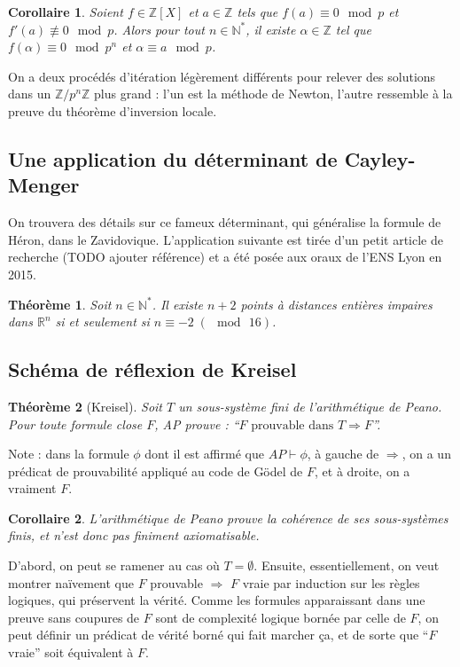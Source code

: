 \documentclass[a4paper, 11pt]{article}
\def\Z{\mathbb{Z}}
\def\N{\mathbb{N}}
\def\R{\mathbb{R}}
\newtheorem*{theorem}{Théorème}
\newtheorem*{corollary}{Corollaire}
\begin{document}
\begin{corollary}
  Soient $f \in \Z[X]$ et $a \in \Z$ tels que $f(a) \equiv 0 \mod p$
  et $f'(a) \not\equiv 0 \mod p$. Alors pour tout $n \in \N^*$, il
  existe $\alpha \in \Z$ tel que $f(\alpha) \equiv 0 \mod p^n$ et
  $\alpha \equiv a \mod p$.
\end{corollary}

On a deux procédés d'itération légèrement différents pour relever des solutions
dans un $\Z/p^n\Z$ plus grand : l'un est la méthode de Newton, l'autre ressemble
à la preuve du théorème d'inversion locale.

\subsection{Une application du déterminant de Cayley-Menger}

On trouvera des détails sur ce fameux déterminant, qui généralise la formule de
Héron, dans le Zavidovique. L'application suivante est tirée d'un petit article
de recherche (TODO ajouter référence) et a été posée aux oraux de l'ENS Lyon en
2015.

\begin{theorem}
  Soit $n \in \N^*$. Il existe $n+2$ points à distances entières impaires dans
  $\R^n$ si et seulement si $n \equiv -2 \; (\mod\,16)$.
\end{theorem}

\subsection{Schéma de réflexion de Kreisel}

\begin{theorem}[Kreisel]
  Soit $T$ un sous-système fini de l'arithmétique de Peano. Pour toute formule
  close $F$, AP prouve : \enquote{$F \text{ prouvable dans } T \Rightarrow F$}.
\end{theorem}
Note : dans la formule $\phi$ dont il est affirmé que $AP \vdash \phi$, à gauche
de $\Rightarrow$, on a un prédicat de prouvabilité appliqué au code de Gödel de
$F$, et à droite, on a vraiment $F$.
\begin{corollary}
  L'arithmétique de Peano prouve la cohérence de ses sous-systèmes finis, et
  n'est donc pas finiment axiomatisable.
\end{corollary}

D'abord, on peut se ramener au cas où $T = \emptyset$. Ensuite, essentiellement,
on veut montrer naïvement que $F$ prouvable $\Rightarrow$ $F$ vraie par
induction sur les règles logiques, qui préservent la vérité. Comme les formules
apparaissant dans une preuve sans coupures de $F$ sont de complexité logique
bornée par celle de $F$, on peut définir un prédicat de vérité borné qui fait
marcher ça, et de sorte que \enquote{$F$ vraie} soit équivalent à $F$.
\end{document}
